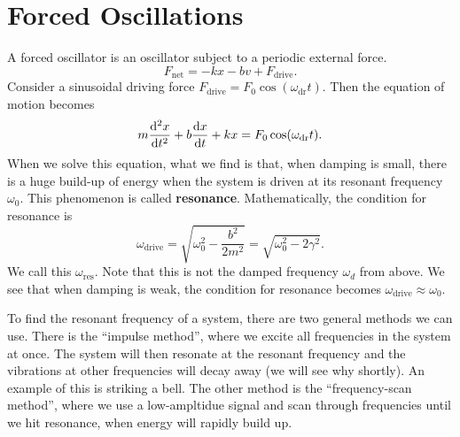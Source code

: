 \documentclass[../classical_mechanics.tex]{subfiles}
\begin{document}
    \section{Forced Oscillations}\label{sec:forced-oscillations}
        A forced oscillator is an oscillator subject to a periodic external force.
        \begin{equation}
            F_\text{net}=-kx-bv+F_\text{drive}.
        \end{equation}
        Consider a sinusoidal driving force $F_\text{drive}=F_0\cos(\omega_\text{dr}t)$.
        Then the equation of motion becomes
        \begin{equation}
            m\dv[2]{x}{t}+b\dv{x}{t}+kx=F_0\cos(\omega_\text{dr}t).
        \end{equation}
        When we solve this equation, what we find is that, when damping is small, there is a huge build-up of energy when the system is driven at its resonant frequency $\omega_0$.
        This phenomenon is called \textbf{resonance}.
        Mathematically, the condition for resonance is
        \begin{equation}
            \omega_\text{drive}=\sqrt{\omega_0^2-\frac{b^2}{2m^2}}=\sqrt{\omega_0^2-2\gamma^2}.
        \end{equation}
        We call this $\omega_\text{res}$.
        Note that this is not the damped frequency $\omega_d$ from above.
        We see that when damping is weak, the condition for resonance becomes $\omega_\text{drive}\approx\omega_0$.

        To find the resonant frequency of a system, there are two general methods we can use.
        There is the ``impulse method'', where we excite all frequencies in the system at once.
        The system will then resonate at the resonant frequency and the vibrations at other frequencies will decay away (we will see why shortly).
        An example of this is striking a bell.
        The other method is the ``frequency-scan method'', where we use a low-ampltidue signal and scan through frequencies until we hit resonance, when energy will rapidly build up.
\end{document}

